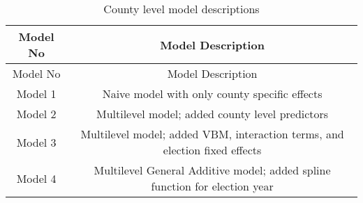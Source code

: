 \documentclass[12pt,twoside]{reedthesis}
\begin{document}
  \begin{longtable}[]{@{}cc@{}}
  \caption{County level model descriptions
  \label{tab:model_desc_county}}\tabularnewline
  \toprule
  \begin{minipage}[b]{0.15\columnwidth}\centering\strut
  Model No\strut
  \end{minipage} & \begin{minipage}[b]{0.80\columnwidth}\centering\strut
  Model Description\strut
  \end{minipage}\tabularnewline
  \midrule
  \endfirsthead
  \toprule
  \begin{minipage}[b]{0.15\columnwidth}\centering\strut
  Model No\strut
  \end{minipage} & \begin{minipage}[b]{0.80\columnwidth}\centering\strut
  Model Description\strut
  \end{minipage}\tabularnewline
  \midrule
  \endhead
  \begin{minipage}[t]{0.15\columnwidth}\centering\strut
  Model 1\strut
  \end{minipage} & \begin{minipage}[t]{0.80\columnwidth}\centering\strut
  Naive model with only county specific effects\strut
  \end{minipage}\tabularnewline
  \begin{minipage}[t]{0.15\columnwidth}\centering\strut
  Model 2\strut
  \end{minipage} & \begin{minipage}[t]{0.80\columnwidth}\centering\strut
  Multilevel model; added county level predictors\strut
  \end{minipage}\tabularnewline
  \begin{minipage}[t]{0.15\columnwidth}\centering\strut
  Model 3\strut
  \end{minipage} & \begin{minipage}[t]{0.80\columnwidth}\centering\strut
  Multilevel model; added VBM, interaction terms, and election fixed
  effects\strut
  \end{minipage}\tabularnewline
  \begin{minipage}[t]{0.15\columnwidth}\centering\strut
  Model 4\strut
  \end{minipage} & \begin{minipage}[t]{0.80\columnwidth}\centering\strut
  Multilevel General Additive model; added spline function for election
  year\strut
  \end{minipage}\tabularnewline
  \bottomrule
  \end{longtable}
  
\end{document}
